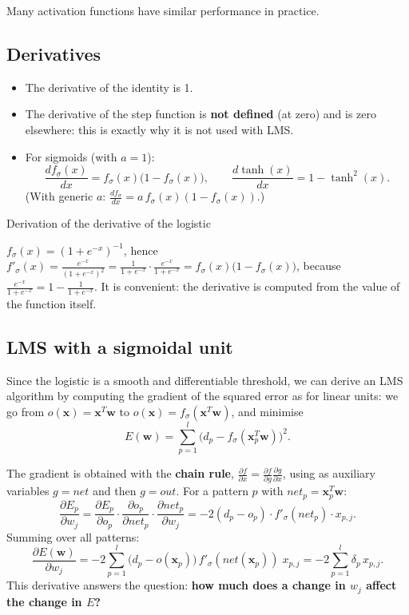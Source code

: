 Many activation functions have similar performance in practice.

\subsection{Derivatives}\label{derivate}

\begin{itemize}
\tightlist
\item
  The derivative of the identity is 1.
\item
  The derivative of the step function is \textbf{not defined} (at zero)
  and is zero elsewhere: this is exactly why it is not used with LMS.
\item
  For sigmoids (with \(a = 1\)): \[
  \frac{df_\sigma(x)}{dx} = f_\sigma(x)\big(1 - f_\sigma(x)\big), \qquad \frac{d\tanh(x)}{dx} = 1 - \tanh^2(x).
  \] (With generic \(a\):
  \(\frac{df_\sigma}{dx} = a\,f_\sigma(x)(1 - f_\sigma(x))\).)
\end{itemize}

\begin{boxnote}{Derivation of the derivative of the logistic}

\(f_\sigma(x) = (1 + e^{-x})^{-1}\), hence
\(f'_\sigma(x) = \frac{e^{-x}}{(1 + e^{-x})^2} = \frac{1}{1 + e^{-x}} \cdot \frac{e^{-x}}{1 + e^{-x}} = f_\sigma(x)\big(1 - f_\sigma(x)\big)\),
because \(\frac{e^{-x}}{1 + e^{-x}} = 1 - \frac{1}{1 + e^{-x}}\). It
is convenient: the derivative is computed from the value of the
function itself.

\end{boxnote}

\subsection{LMS with a sigmoidal
unit}\label{lms-con-ununituxe0-sigmoidale}

Since the logistic is a smooth and differentiable threshold, we can
derive an LMS algorithm by computing the gradient of the squared error
as for linear units: we go from
\(o(\mathbf{x}) = \mathbf{x}^T\mathbf{w}\) to
\(o(\mathbf{x}) = f_\sigma(\mathbf{x}^T\mathbf{w})\), and minimise \[
E(\mathbf{w}) = \sum_{p=1}^{l}\big(d_p - f_\sigma(\mathbf{x}_p^T\mathbf{w})\big)^2.
\]

The gradient is obtained with the \textbf{chain rule},
\(\frac{\partial f}{\partial x} = \frac{\partial f}{\partial g}\frac{\partial g}{\partial x}\),
using as auxiliary variables \(g = net\) and then \(g = out\). For a
pattern \(p\) with \(net_p = \mathbf{x}_p^T\mathbf{w}\): \[
\frac{\partial E_p}{\partial w_j} = \frac{\partial E_p}{\partial o_p}\cdot\frac{\partial o_p}{\partial net_p}\cdot\frac{\partial net_p}{\partial w_j} = -2(d_p - o_p)\cdot f'_\sigma(net_p)\cdot x_{p,j}.
\] Summing over all patterns: \[
\frac{\partial E(\mathbf{w})}{\partial w_j} = -2\sum_{p=1}^{l}\big(d_p - o(\mathbf{x}_p)\big)\, f'_\sigma(net(\mathbf{x}_p))\; x_{p,j} = -2\sum_{p=1}^{l}\delta_p\, x_{p,j}.
\] This derivative answers the question: \textbf{how much does a
change in \(w_j\) affect the change in \(E\)?}

